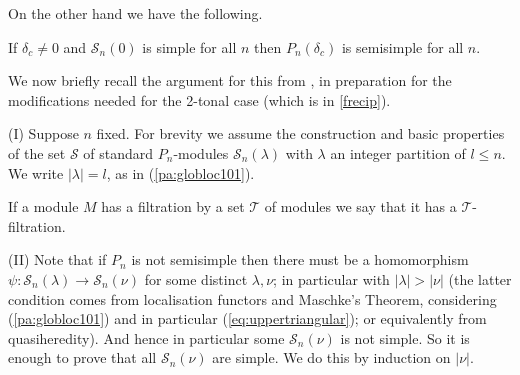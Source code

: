 \documentclass[reqno,10pt,a4paper]{amsart}
\newcommand{\N}{\mathbb{N}}
\newcommand{\red}[1]{\textcolor{red}{#1}}
\newcommand{\ppm}[1]{\red{#1}}
\newcommand{\cell}{\mathcal{S}}
\newcommand{\SSS}{\mathcal{S}} %
\newcommand{\ignore}[1]{}
\begin{document}
\medskip

On the other hand we have the following. 

\mdef \label{pa:indicator}
\ignore{{ 
Finally we %
argue
by Frobenius reciprocity 
using properties of the standard module restriction rules (as indicated in Fig.\ref{fig:PnBratelli} for example), 
that 
}}
%
If $\delta_c \neq 0$ and 
$\SSS_n(0)$ is simple for all $n$ then 
$P_n (\delta_c)$ is semisimple for all $n$.

\medskip 

\newcommand{\ind}{Ind\;}
\newcommand{\res}{Res\;}
\newcommand{\mul}{\lambda}
\newcommand{\nul}{\nu}
\newcommand{\bigplus}{\sum} 
\newcommand{\lleadsto}{\mbox{\reflectbox{$\leadsto$}}}

We 
now 
briefly recall the argument for this from \cite{MartinSaleur94b}, in preparation
for the 
modifications needed for the 
2-tonal case (which is in \ref{frecip}).
% 

\noindent 
(I)
Suppose $n$ fixed. 
For brevity we assume the construction and basic properties of
the set $\SSS$ of standard $P_n$-modules $\SSS_n(\lambda)$ with 
$\lambda$ an integer partition of $l\leq n$. 
We write $|\lambda| = l$, as in (\ref{pa:globloc101}).

If a module $M$ has a filtration by a set ${\mathcal T}$ of modules we say that it has %
a ${\mathcal T}$-filtration.

\noindent
(II)
Note that if $P_n$ is not semisimple then there must be a homomorphism
$\psi: \SSS_n(\mul) \rightarrow \SSS_n(\nul)$ for some 
distinct $\mul,\nul$;
in particular with $|\mul| > |\nul |$
(the latter condition comes from localisation functors and Maschke's Theorem,
considering (\ref{pa:globloc101})
and in particular (\ref{eq:uppertriangular});
or equivalently from quasiheredity).
And hence in particular some $\SSS_n(\nul) $ is not simple. 
So it is enough to prove that all $\SSS_n(\nul) $ are simple. 
We do this by induction on $|\nul|$.
\ignore{ 
Assuming $\delta \not\in \N_0$ then it 
is straightforward to eliminate cases with $|\mul| = |\nul | +1$,
so we consider $|\mul| > |\nul | +1$.
}
\end{document}
